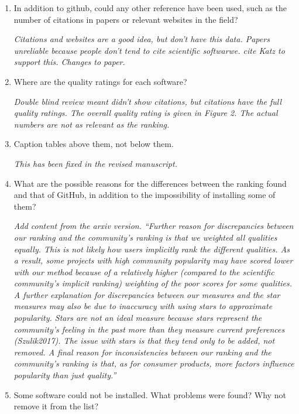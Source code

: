 \documentclass[12pt]{casletter}
\begin{document}
\begin{letter}
\begin{enumerate}
{  \smallskip}

  \item In addition to github, could any other reference have been used, such as
  the number of citations in papers or relevant websites in the field? \medskip

  \emph{Citations and websites are a good idea, but don't have this data.
  Papers unreliable because people don't tend to cite scientific softwarwe.
  cite Katz to support this.  Changes to paper.\smallskip}

  \item Where are the quality ratings for each software? \medskip

  \emph{Double blind review meant didn't show citations, but citations have the
  full quality ratings.  The overall quality rating is given in Figure 2. The
  actual numbers are not as relevant as the ranking. \smallskip}

  \item Caption tables above them, not below them. \medskip

  \emph{This has been fixed in the revised manuscript.  \smallskip}

  \item What are the possible reasons for the differences between the ranking
  found and that of GitHub, in addition to the impossibility of installing some
  of them? \medskip

  \emph{Add content from the arxiv version.  ``Further reason for discrepancies
  between our ranking and the community's ranking is that we weighted all
  qualities equally. This is not likely how users implicitly rank the different
  qualities. As a result, some projects with high community popularity may have
  scored lower with our method because of a relatively higher (compared to the
  scientific community's implicit ranking) weighting of the poor scores for some
  qualities. A further explanation for discrepancies between our measures and
  the star measures may also be due to inaccuracy with using stars to
  approximate popularity.  Stars are not an ideal measure because stars
  represent the community's feeling in the past more than they measure current
  preferences (Szulik2017).  The issue with stars is that they tend only
  to be added, not removed.  A final reason for inconsistencies between our
  ranking and the community's ranking is that, as for consumer products, more
  factors influence popularity than just quality.'' \smallskip}

  \item Some software could not be installed. What problems were found? Why not
  remove it from the list? \medskip


\end{enumerate}
\end{letter}
\end{document}

